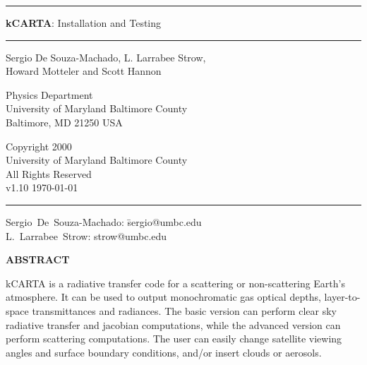 \documentclass[11pt]{article}
\newcommand{\kc}{\textsf{kCARTA}\xspace}
\newcommand{\HRule}{\rule{\linewidth}{1mm}}
\newcommand{\HRulethin}{\rule{\linewidth}{0.5mm}}
\begin{document}
\thispagestyle{empty}
\vspace{2.0in}

\noindent\HRule
\begin{center}
\Huge \textbf{\textsf{kCARTA}}: Installation and Testing
\end{center}
\noindent\HRule

\vspace{0.75in}
\begin{center}
\begin{Large}
Sergio De Souza-Machado, L. Larrabee Strow,\\ Howard Motteler and Scott
Hannon
\end{Large}
\end{center}

\vspace{0.5in}
\begin{center}
Physics Department\\
University of Maryland Baltimore County\\Baltimore, MD 21250 USA\\
\end{center}

\vspace{0.5in}
\begin{center}
Copyright 2000 \\
University of Maryland Baltimore County \\
All Rights Reserved\\
v1.10  \today\\
\end{center}

\vfill

\noindent\HRulethin
\begin{flushleft}
\begin{tabbing}
Sergio~De~Souza-Machado: \=    sergio@umbc.edu \\
L.~Larrabee~Strow:   \>        strow@umbc.edu\\
\end{tabbing}
\end{flushleft}


\newpage
\tableofcontents
\listoftables
\listoffigures
\newpage

\begin{center}
{\bf ABSTRACT}
\end{center}
\kc is a radiative transfer code for a scattering or non-scattering Earth's
atmosphere.  It can be used to output monochromatic gas optical
depths, layer-to-space transmittances and radiances.  The basic version can 
perform clear sky radiative transfer and jacobian computations, while the
advanced version can perform scattering computations. The user can easily 
change satellite viewing angles and surface boundary conditions, and/or insert 
clouds or aerosols. 
\end{document}
